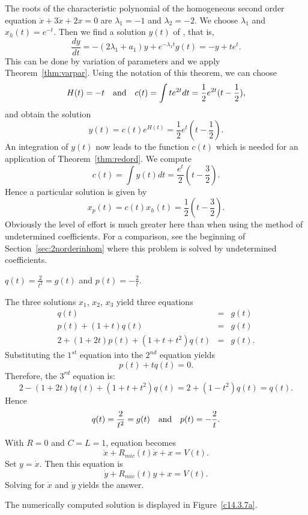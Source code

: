 \documentclass{ximera}
\begin{document}
\soln The roots of the characteristic polynomial of the homogeneous
second order equation $\ddot x + 3\dot x + 2x = 0$
are $\lambda_1 = -1 $ and $\lambda_2 = -2$.
We choose $\lambda_1$ and $x_h(t)=e^{-t}$.  Then we find a solution
$y(t)$ of , that is,
\[
\frac{dy}{dt} = -(2\lambda_1 +a_1) y + e^{-\lambda_1 t}g(t) =
-y + te^t.
\]
This can be done by variation of parameters and we apply
Theorem~\ref{thm:varpar}.  Using the notation of this theorem, we can
choose
\[
H(t) = -t \quad\mbox{and}\quad c(t) = \int t e^{2t} dt = \frac{1}{2}e^{2t}(t-\frac{1}{2}),
\]
and obtain the solution
\[
y(t) = c(t)e^{H(t)} = \frac{1}{2}e^{t}(t-\frac{1}{2}).
\]
An integration of $y(t)$ now leads to the function $c(t)$ which is needed
for an application of Theorem~\ref{thm:redord}.  We compute
\[
c(t) = \int y(t)dt = \frac{e^t}{2}(t-\frac{3}{2}).
\]
Hence a particular solution is given by
\[
x_p(t) = c(t) x_h(t) =  \frac{1}{2}(t-\frac{3}{2}).
\]
Obviously the level of effort is much greater here than when using the method
of undetermined coefficients.  For a comparison, see the
beginning of Section~\ref{sec:2norderinhom} where
this problem is solved by undetermined coefficients.


 \ans $q(t) = \frac{2}{t^2} = g(t)$ and  
$p(t) = -\frac{2}{t}$.

\soln  The three solutions $x_1$, $x_2$, $x_3$ yield three equations
\begin{eqnarray*}
q(t) & = & g(t)\\
p(t) +(1+t)q(t) & = & g(t)\\
2 + (1+2t)p(t) + (1+t+t^2)q(t) & = & g(t).
\end{eqnarray*}
Substituting the $1^{st}$ equation into the $2^{nd}$ equation yields
\[
p(t) + tq(t) = 0.
\]
Therefore, the $3^{rd}$ equation is:
\[
2 - (1+2t)tq(t) + (1+t+t^2)q(t) = 2 + (1-t^2)q(t) = q(t).
\]
Hence 
\[
q(t) = \frac{2}{t^2} = g(t) \quad\mbox{and}\quad  p(t) = -\frac{2}{t}.
\]

With $R=0$ and $C=L=1$, equation  becomes
\[
\ddot{x} + R_{mic}(t)\dot{x} + x = V(t).
\]
Set $y=\dot{x}$.  Then this equation is
\[
\dot{y} + R_{mic}(t)y + x = V(t).
\]
Solving for $\dot{x}$ and $\dot{y}$ yields the answer. 

 \ans The numerically computed solution is displayed in 
Figure~\ref{c14.3.7a}.
\end{document}
